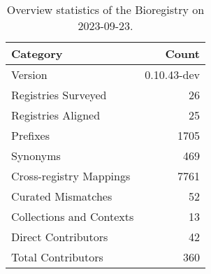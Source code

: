 \begin{table}
\caption{Overview statistics of the Bioregistry on 2023-09-23.}
\label{tab:bioregistry-summary}
\begin{tabular}{lr}
\toprule
Category & Count \\
\midrule
Version & 0.10.43-dev \\
Registries Surveyed & 26 \\
Registries Aligned & 25 \\
Prefixes & 1705 \\
Synonyms & 469 \\
Cross-registry Mappings & 7761 \\
Curated Mismatches & 52 \\
Collections and Contexts & 13 \\
Direct Contributors & 42 \\
Total Contributors & 360 \\
\bottomrule
\end{tabular}
\end{table}
